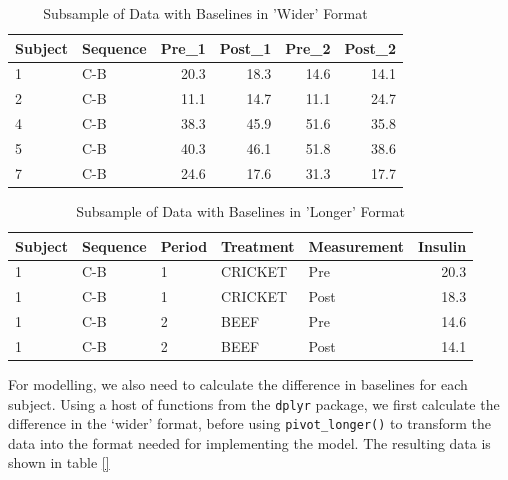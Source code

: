 \begin{table}

\caption{\label{tab:data-wide-demo-baseline}Subsample of Data with Baselines in 'Wider' Format}
\centering
\begin{tabular}[t]{llrrrr}
\toprule
Subject & Sequence & Pre\_1 & Post\_1 & Pre\_2 & Post\_2\\
\midrule
1 & C-B & 20.3 & 18.3 & 14.6 & 14.1\\
2 & C-B & 11.1 & 14.7 & 11.1 & 24.7\\
4 & C-B & 38.3 & 45.9 & 51.6 & 35.8\\
5 & C-B & 40.3 & 46.1 & 51.8 & 38.6\\
7 & C-B & 24.6 & 17.6 & 31.3 & 17.7\\
\bottomrule
\end{tabular}
\end{table}

\begin{table}

\caption{\label{tab:data-long-demo-baseline}Subsample of Data with Baselines in 'Longer' Format}
\centering
\begin{tabular}[t]{lllllr}
\toprule
Subject & Sequence & Period & Treatment & Measurement & Insulin\\
\midrule
1 & C-B & 1 & CRICKET & Pre & 20.3\\
1 & C-B & 1 & CRICKET & Post & 18.3\\
1 & C-B & 2 & BEEF & Pre & 14.6\\
1 & C-B & 2 & BEEF & Post & 14.1\\
\bottomrule
\end{tabular}
\end{table}

For modelling, we also need to calculate the difference in baselines for
each subject. Using a host of functions from the \texttt{dplyr} package,
we first calculate the difference in the `wider' format, before using
\texttt{pivot\_longer()} to transform the data into the format needed
for implementing the model. The resulting data is shown in table \ref{}

